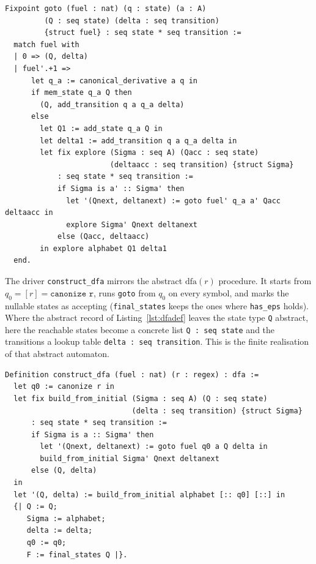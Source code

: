 \begin{lstlisting}[style=rocqstyle,caption={The recursive exploration \texttt{goto} (\texttt{AutomataConstruction.v}).},label={lst:goto}]
Fixpoint goto (fuel : nat) (q : state) (a : A)
         (Q : seq state) (delta : seq transition)
         {struct fuel} : seq state * seq transition :=
  match fuel with
  | 0 => (Q, delta)
  | fuel'.+1 =>
      let q_a := canonical_derivative a q in
      if mem_state q_a Q then
        (Q, add_transition q a q_a delta)
      else
        let Q1 := add_state q_a Q in
        let delta1 := add_transition q a q_a delta in
        let fix explore (Sigma : seq A) (Qacc : seq state)
                        (deltaacc : seq transition) {struct Sigma}
            : seq state * seq transition :=
            if Sigma is a' :: Sigma' then
              let '(Qnext, deltanext) := goto fuel' q_a a' Qacc deltaacc in
              explore Sigma' Qnext deltanext
            else (Qacc, deltaacc)
        in explore alphabet Q1 delta1
  end.
\end{lstlisting}

The driver \texttt{construct\_dfa} mirrors the abstract $\mathrm{dfa}(r)$ procedure.
It starts from $q_0=[r]=\texttt{canonize r}$, runs \texttt{goto} from $q_0$ on every
symbol, and marks the nullable states as accepting (\texttt{final\_states} keeps the
ones where \texttt{has\_eps} holds). Where the abstract record of
Listing~\ref{lst:dfadef} leaves the state type \texttt{Q} abstract, here the
reachable states become a concrete list \texttt{Q : seq state} and the transitions a
lookup table \texttt{delta : seq transition}. This is the finite realisation of that
abstract automaton.

\begin{lstlisting}[style=rocqstyle,caption={The driver \texttt{construct\_dfa} (\texttt{AutomataConstruction.v}).},label={lst:constructdfa}]
Definition construct_dfa (fuel : nat) (r : regex) : dfa :=
  let q0 := canonize r in
  let fix build_from_initial (Sigma : seq A) (Q : seq state)
                             (delta : seq transition) {struct Sigma}
      : seq state * seq transition :=
      if Sigma is a :: Sigma' then
        let '(Qnext, deltanext) := goto fuel q0 a Q delta in
        build_from_initial Sigma' Qnext deltanext
      else (Q, delta)
  in
  let '(Q, delta) := build_from_initial alphabet [:: q0] [::] in
  {| Q := Q;
     Sigma := alphabet;
     delta := delta;
     q0 := q0;
     F := final_states Q |}.
\end{lstlisting}

